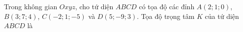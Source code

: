 \begin{ex}
Trong không gian $Oxyz$, cho tứ diện $ABCD$ có tọa độ các đỉnh $A(2;1;0)$, $B(3;7;4)$, $C(-2;1;-5)$ và $D(5;-9;3)$. Tọa độ trọng tâm $K$ của tứ diện $ABCD$ là
\end{ex}
